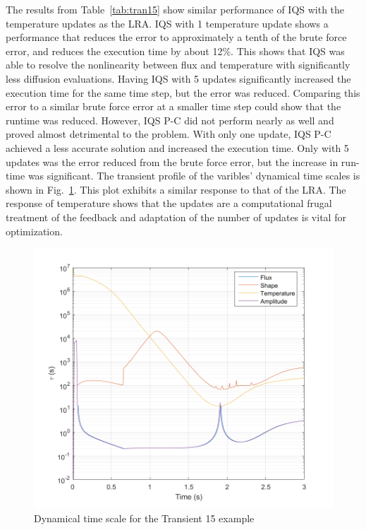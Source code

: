 \documentclass{anstrans}
\newcommand{\fig}[1]{Fig.~\ref{#1}}                      %
\newcommand{\tbl}[1]{Table~\ref{#1}}                     %
\begin{document}
The results from \tbl{tab:tran15} show similar performance of IQS with the temperature updates as the LRA.  IQS with 1 temperature update shows a performance that reduces the error to approximately a tenth of the brute force error, and reduces the execution time by about 12\%.  This shows that IQS was able to resolve the nonlinearity between flux and temperature with significantly less diffusion evaluations.  Having IQS with 5 updates significantly increased the execution time for the same time step, but the error was reduced.  Comparing this error to a similar brute force error at a smaller time step could show that the runtime was reduced.  However, IQS P-C did not perform nearly as well and proved almost detrimental to the problem.  With only one update, IQS P-C achieved a less accurate solution and increased the execution time.  Only with 5 updates was the error reduced from the brute force error, but the increase in run-time was significant. The transient profile of the varibles' dynamical time scales is shown in \fig{fig:tran15tc}.  This plot exhibits a similar response to that of the LRA. The response of temperature shows that the updates are a computational frugal treatment of the feedback and adaptation of the number of updates is vital for optimization. \\

\begin{figure}[htbp!]
\centering
\includegraphics[width=\linewidth]{time_constant_tran15.png}
\caption{Dynamical time scale for the Transient 15 example}
\label{fig:tran15tc}
\end{figure}
\end{document}
